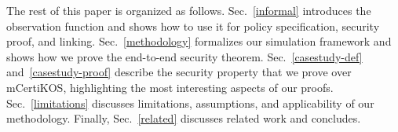 The rest of this paper is organized as
follows. Sec.~\ref{informal} introduces the
observation function and shows how to use it for policy
specification, security proof, and linking.
Sec.~\ref{methodology} formalizes our simulation framework and
shows how we prove the end-to-end security theorem. 
Sec.~\ref{casestudy-def} and~\ref{casestudy-proof} describe the
security property that we prove over mCertiKOS, 
highlighting the most interesting aspects of our proofs. 
Sec.~\ref{limitations} discusses limitations, assumptions,
and applicability of our methodology. Finally, Sec.~\ref{related}
discusses related work and concludes.

